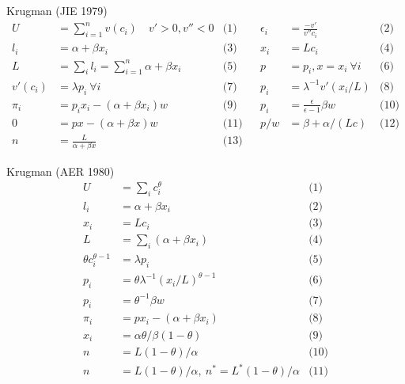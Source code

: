 \documentclass[10pt,notes=hide]{beamer}
\begin{document}
\begin{frame}{Krugman (JIE 1979)}
\begin{align*}
U &= \sum_{i=1}^{n} v(c_i) \quad v'>0, v''<0
&\text{(1)} &&
\epsilon_i &= \frac{-v'}{v'' c_i}
&\text{(2)} \\
l_i &= \alpha + \beta x_i
&\text{(3)} &&
x_i &= L c_i
&\text{(4)} \\
L &= \sum_i l_i = \sum_{i=1}^{n} \alpha + \beta x_i
&\text{(5)} &&
p &= p_i, x=x_i \ \forall i 
&\text{(6)} \\
v'(c_i) &= \lambda p_i \ \forall i 
&\text{(7)} &&
p_i &= \lambda^{-1} v'\left(x_i / L\right) 
&\text{(8)} \\
\pi_i &= p_i x_i - (\alpha+\beta x_i) w 
&\text{(9)} &&
p_i &= \frac{\epsilon}{\epsilon-1}\beta w 
&\text{(10)} \\
0 &= px - (\alpha+\beta x)w 
&\text{(11)} &&
p/w & = \beta + \alpha/(Lc) 
&\text{(12)} \\
n &= \frac{L}{\alpha + \beta x} 
&\text{(13)}
\end{align*}
\end{frame}
\begin{frame}{Krugman (AER 1980)}
\begin{align*}
U &= \sum_i c_i^{\theta} 
&\text{(1)} \\
l_i &= \alpha + \beta x_i 
&\text{(2)} \\
x_i &= L c_i 
&\text{(3)} \\
L &= \sum_i (\alpha + \beta x_i) 
&\text{(4)} \\
\theta c_i ^{\theta-1} &= \lambda p_i 
&\text{(5)} \\
p_i &=  \theta \lambda^{-1} (x_i / L)^{\theta-1} 
&\text{(6)} \\
p_i &= \theta^{-1} \beta w 
&\text{(7)} \\
\pi_i &= px_i - (\alpha+\beta x_i) 
&\text{(8)} \\
x_i &= \alpha \theta / \beta (1-\theta) 
&\text{(9)} \\
n &= L(1-\theta)/\alpha 
&\text{(10)} \\
n &= L(1-\theta)/\alpha, \  n^* = L^*(1-\theta)/\alpha 
&\text{(11)}
\end{align*}
\end{frame}
\end{document}
